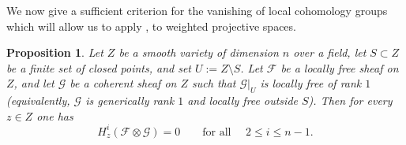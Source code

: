 \documentclass[12pt,twoside,]{amsart}
\theoremstyle{plain}
\newtheorem{proposition}[theorem]{Proposition}
\theoremstyle{definition}
\begin{document}
\color{black}

\medskip

We now give a sufficient criterion for the vanishing of local cohomology groups which will allow us to apply , to weighted projective spaces.

\begin{proposition}\label{vanishing of second local cohomology}
Let $Z$ be a smooth variety of dimension $n$ over a field, let $S\subset Z$ be a finite
set of closed points, and set $U:=Z\setminus S$. Let $\mathcal F$ be a locally free
sheaf on $Z$, and let $\mathcal G$ be a coherent sheaf on $Z$ such that
$\mathcal G|_U$ is locally free of rank $1$ (equivalently, $\mathcal G$ is generically
rank $1$ and locally free outside $S$).
Then for every $z\in Z$ one has
\[
H^i_z(\mathcal F\otimes \mathcal G)=0
\qquad\text{for all }\quad 2\le i\le n-1.
\]

\end{proposition}
\end{document}
